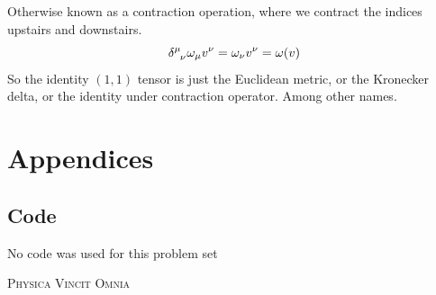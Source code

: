 \documentclass[12pt,a4paper]{article}
\begin{document}
\begin{solution_pset}
		Otherwise known as a contraction operation, where
		we contract the indices upstairs and downstairs.
		\[
			\delta\indices{^\mu_\nu} \omega_\mu v^\nu = \omega_\nu v^\nu = \omega(v)
		\]
		So the identity $(1,1)$ tensor is just the Euclidean metric, or 
		the Kronecker delta, or the identity under contraction operator.
		Among other names.
		


	\end{solution_pset}
	\newpage
	 
	 
	\section*{Appendices}
		\label{appendix}
		\subsection*{Code} 
		No code was used for this problem set
	\vfill
	\begin{center}
		{
			\Large
			\textsc{Physica Vincit Omnia}
		}
	\end{center}
\end{document}
